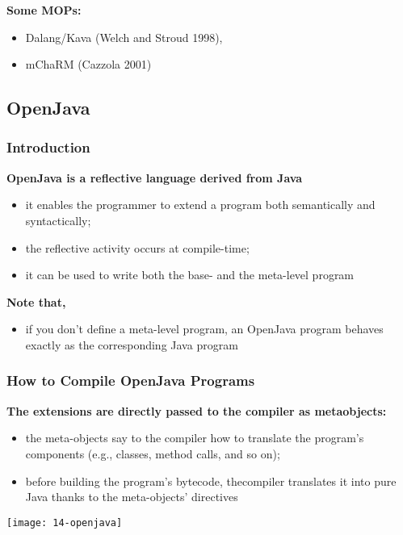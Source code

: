 \textbf{Some MOPs:}

\begin{itemize}
	\item Dalang/Kava (Welch and Stroud 1998), 
	\item mChaRM (Cazzola 2001)
\end{itemize}

\subsection{OpenJava}

\subsubsection{Introduction}

\textbf{OpenJava is a reflective language derived from Java}
\begin{itemize}
	\item it enables the programmer to extend a program both semantically and syntactically;
	\item the reflective activity occurs at compile-time;
	\item it can be used to write both the base- and the meta-level program
\end{itemize}

\textbf{Note that,}

\begin{itemize}
	\item if you don’t define a meta-level program, an OpenJava program behaves exactly as the corresponding Java program
\end{itemize}

\subsubsection{How to Compile OpenJava Programs}

\textbf{The extensions are directly passed to the compiler as metaobjects:}

\begin{itemize}
	\item the meta-objects say to the compiler how to translate the program’s components (e.g., classes, method calls, and so on);
	\item before building the program’s bytecode, thecompiler translates it into pure Java thanks to the meta-objects’ directives
\end{itemize}

\begin{center}
\texttt{[image: 14-openjava]}
\end{center}

